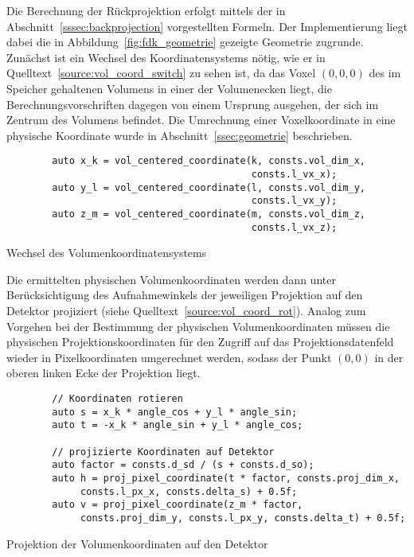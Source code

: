 Die Berechnung der Rückprojektion erfolgt mittels der in Abschnitt~\ref{sssec:backprojection} vorgestellten Formeln. Der
Implementierung liegt dabei die in Abbildung~\ref{fig:fdk_geometrie} gezeigte Geometrie zugrunde. Zunächst ist ein
Wechsel des Koordinatensystems nötig, wie er in Quelltext~\ref{source:vol_coord_switch} zu sehen ist, da das Voxel
$(0, 0, 0)$ des im Speicher gehaltenen Volumens in einer der Volumenecken liegt, die Berechnungsvorschriften dagegen von
einem Ursprung ausgehen, der sich im Zentrum des Volumens befindet. Die Umrechnung einer Voxelkoordinate in eine
physische Koordinate wurde in Abschnitt~\ref{ssec:geometrie} beschrieben.

\begin{code}
\begin{verbatim}
        auto x_k = vol_centered_coordinate(k, consts.vol_dim_x,
                                           consts.l_vx_x);
        auto y_l = vol_centered_coordinate(l, consts.vol_dim_y,
                                           consts.l_vx_y);
        auto z_m = vol_centered_coordinate(m, consts.vol_dim_z,
                                           consts.l_vx_z);
\end{verbatim}
\caption{Wechsel des Volumenkoordinatensystems}
\label{source:vol_coord_switch}
\end{code}

Die ermittelten physischen Volumenkoordinaten werden dann unter Berücksichtigung des Aufnahmewinkels der jeweiligen
Projektion auf den Detektor projiziert (siehe Quelltext~\ref{source:vol_coord_rot}). Analog zum Vorgehen bei der
Bestimmung der physischen Volumenkoordinaten müssen die physischen Projektionskoordinaten für den Zugriff auf das
Projektionsdatenfeld wieder in Pixelkoordinaten umgerechnet werden, sodass der Punkt $(0, 0)$ in der oberen linken Ecke
der Projektion liegt.

\begin{code}
\begin{verbatim}
        // Koordinaten rotieren
        auto s = x_k * angle_cos + y_l * angle_sin;
        auto t = -x_k * angle_sin + y_l * angle_cos;

        // projizierte Koordinaten auf Detektor
        auto factor = consts.d_sd / (s + consts.d_so);
        auto h = proj_pixel_coordinate(t * factor, consts.proj_dim_x,
             consts.l_px_x, consts.delta_s) + 0.5f;
        auto v = proj_pixel_coordinate(z_m * factor,
             consts.proj_dim_y, consts.l_px_y, consts.delta_t) + 0.5f;
\end{verbatim}
\caption{Projektion der Volumenkoordinaten auf den Detektor}
\label{source:vol_coord_rot}
\end{code}

